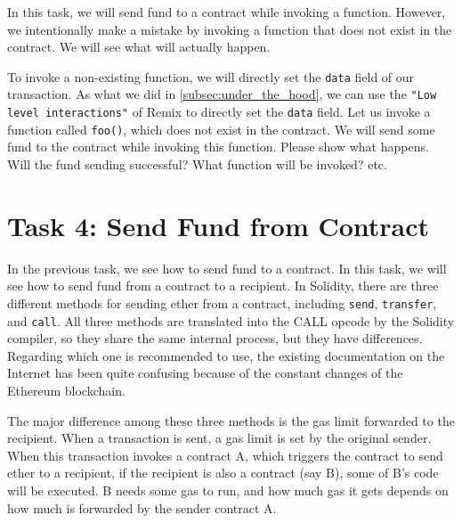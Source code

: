 In this task, we will send fund to a contract while invoking 
a function. However, we intentionally make a mistake 
by invoking a function that does not exist in the contract. 
We will see what will actually happen. 

To invoke a non-existing function, we will directly 
set the \texttt{data} field of our transaction. 
As what we did in \ref{subsec:under_the_hood}, 
we can use the \texttt{"Low level interactions"} of 
Remix to directly set the \texttt{data} field. 
Let us invoke a function called \texttt{foo()}, which
does not exist in the contract. We will send some fund
to the contract while invoking this function. Please 
show what happens. Will the fund sending successful? 
What function will be invoked? etc. 
 


\section{Task 4: Send Fund from Contract}

In the previous task, we see how to send fund to a contract. In this 
task, we will see how to send fund from a contract to a recipient. 
In Solidity, there are three different methods for sending ether 
from a contract, including
\texttt{send}, \texttt{transfer}, and \texttt{call}.    
All three methods are translated into the CALL opcode by the 
Solidity compiler, so they share the same internal process, but
they have differences. 
Regarding which one is recommended to use, the 
existing documentation on the Internet has been quite confusing 
because of the constant changes of the Ethereum blockchain.


The major difference among these three methods is the 
gas limit forwarded to the recipient. 
When a transaction is sent, a gas limit is set by the 
original sender. When this transaction invokes a contract A, which
triggers the contract to send ether to a recipient, 
if the recipient is also a contract (say B), some of B's 
code will be executed. B needs some gas to run, and how much gas
it gets depends on how much is forwarded by the sender contract A. 


